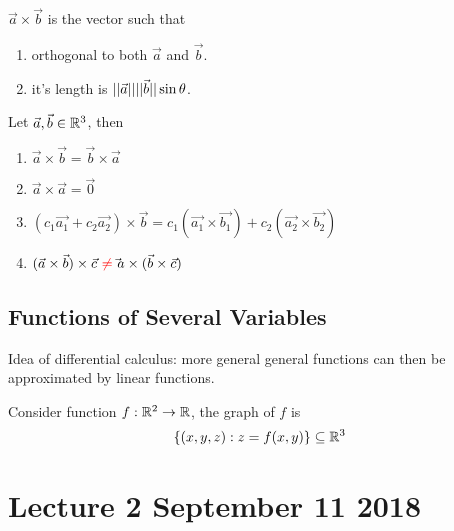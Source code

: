 \documentclass[]{article}
\begin{document}
            \begin{remark} $\vec{a} \times \vec{b}$ is the vector such that
                \begin{enumerate}
                    \item orthogonal to both $\vec{a}$ and $\vec{b}$.
                    \item it's length is $\vert \vert \vec{{a}} \vert \vert\vert \vert \vec{{b}} \vert \vert\sin{\theta}$.
                \end{enumerate}
            \end{remark}
            
            \begin{proposition} Let $\vec{a}, \vec{b} \in \mathbb{R}^3$, then
                \begin{enumerate}
                    \item $\vec{a} \times \vec{b} = \vec{b} \times \vec{a}$
                    \item $\vec{a} \times \vec{a} = \vec{0}$
                    \item $(c_1 \vec{a_1} + c_2 \vec{a_2}) \times \vec{b} = c_1 (\vec{a_1} \times \vec{b_1}) + c_2 (\vec{a_2} \times \vec{b_2})$
                    \item $(\vec{a} \times \vec{b}) \times \vec{c} \textcolor{red}{\ \neq\ } \vec{}{a} \times (\vec{b} \times \vec{c})$
                \end{enumerate}
            \end{proposition}
    \subsection{Functions of Several Variables}
        \begin{remark}
            Idea of differential calculus: more general general functions can then be approximated by linear functions.
        \end{remark}
        
        \begin{definition}
            Consider function ${f}: {\mathbb{R}^2} \to {\mathbb{R}}$, the graph of $f$ is 
            \[
                \{(x,y,z): z = f(x,y)\} \subseteq \mathbb{R}^3
            \]
        \end{definition}
        
	\section{Lecture 2 September 11 2018}
\end{document}
